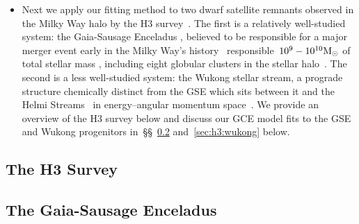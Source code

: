 \documentclass[ms.tex]{subfiles}
\begin{document}
\begin{itemize}

	\item Next we apply our fitting method to two dwarf satellite remnants
	observed in the Milky Way halo by the H3 survey~\citep{Conroy2019}.
	The first is a relatively well-studied system: the Gaia-Sausage Enceladus
	\citep[GSE;][]{Belokurov2018, Helmi2018}, believed to be responsible for
	a major merger event early in the Milky Way's history~\citep{Chaplin2020}
	responsible~$10^9 - 10^{10} \text{M}_\odot$ of total stellar mass
	\citep{Deason2019, Fattahi2019, Mackereth2019, Vincenzo2019}, including
	eight globular clusters in the stellar halo~\citep{Myeong2018}.
	The second is a less well-studied system: the Wukong stellar stream,
	a prograde structure chemically distinct from the GSE which sits between it
	and the Helmi Streams~\citep{Helmi1999} in energy--angular momentum
	space~\citep{Naidu2020, Naidu2022}.
	We provide an overview of the H3 survey below and discuss our GCE model
	fits to the GSE and Wukong progenitors in~\S\S~\ref{sec:h3:gse}
	and~\ref{sec:h3:wukong} below.

\end{itemize}

\subsection{The H3 Survey}
\label{sec:h3:survey}

\subsection{The Gaia-Sausage Enceladus}
\label{sec:h3:gse}
\end{document}

